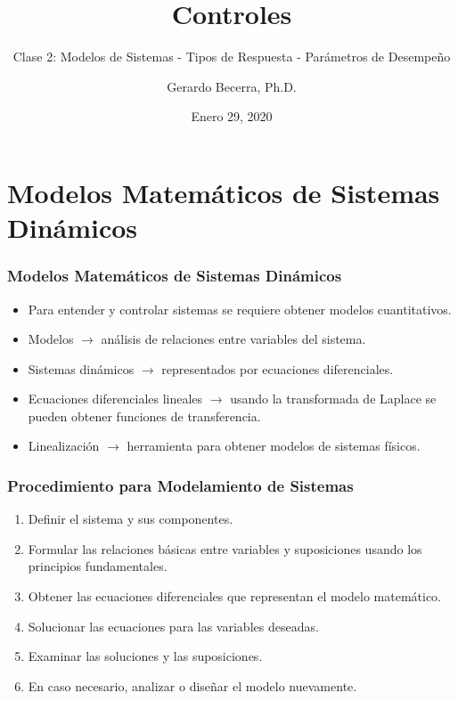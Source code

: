 \documentclass[aspectratio=169,handout]{beamer}
\title{Controles}
\subtitle{\small Clase 2: Modelos de Sistemas - Tipos de Respuesta - Parámetros de Desempeño}
\author{Gerardo Becerra, Ph.D.}
\institute{Pontificia Universidad Javeriana\\ Departamento de Electrónica}
\date{Enero 29, 2020}
\theoremstyle{definition}
\theoremstyle{plain}
\theoremstyle{remark}
\begin{document}
\frame{\titlepage}	


\section{Modelos Matemáticos de Sistemas Dinámicos}
\begin{frame}[<+->]\frametitle{Modelos Matemáticos de Sistemas Dinámicos}
\begin{itemize}
  \item Para entender y controlar sistemas se requiere obtener modelos cuantitativos.
  \item Modelos $\rightarrow$ análisis de relaciones entre variables del sistema.
  \item Sistemas dinámicos $\rightarrow$ representados por ecuaciones diferenciales.
  \item Ecuaciones diferenciales lineales $\rightarrow$ usando la transformada de Laplace se pueden obtener funciones de transferencia.
  \item Linealización $\rightarrow$ herramienta para obtener modelos de sistemas físicos.
\end{itemize}
\end{frame}

\begin{frame}[<+->]\frametitle{Procedimiento para Modelamiento de Sistemas}
\begin{enumerate}
  \item Definir el sistema y sus componentes.
  \item Formular las relaciones básicas entre variables y suposiciones usando los principios fundamentales.
  \item Obtener las ecuaciones diferenciales que representan el modelo matemático.
  \item Solucionar las ecuaciones para las variables deseadas.
  \item Examinar las soluciones y las suposiciones.
  \item En caso necesario, analizar o diseñar el modelo nuevamente.
\end{enumerate}
\end{frame}
\end{document}
